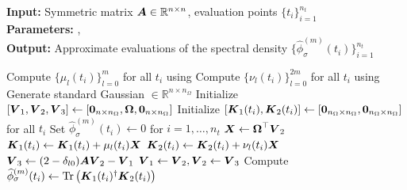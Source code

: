 \hspace*{\algorithmicindent} \textbf{Input:} Symmetric matrix $\boldsymbol{A} \in \mathbb{R}^{n \times n}$, evaluation points $\{t_i\}_{i=1}^{n_t}$ \\
\hspace*{\algorithmicindent} \textbf{Parameters:} ,  \\
\hspace*{\algorithmicindent} \textbf{Output:} Approximate evaluations of the spectral density $\{\widehat{\phi}_{\sigma}^{(m)}(t_i)\}_{i=1}^{n_t}$
\begin{algorithmic}[1]
    \State Compute $\{\mu_l(t_i)\}_{l=0}^{m}$ for all $t_i$ using 
    \State Compute $\{\nu_l(t_i)\}_{l=0}^{2m}$ for all $t_i$ using 
    \State Generate standard Gaussian  $\in \mathbb{R}^{n \times n_{\Omega}}$ %
    \State Initialize $[\boldsymbol{V}_1, \boldsymbol{V}_2, \boldsymbol{V}_3] \gets [\boldsymbol{0}_{n \times n_{\Omega}}, \boldsymbol{\Omega}, \boldsymbol{0}_{n \times n_{\Omega}}]$
    \State Initialize $[\boldsymbol{K}_1(t_i), \boldsymbol{K}_2(t_i)] \gets [\boldsymbol{0}_{n_{\Omega} \times n_{\Omega}}, \boldsymbol{0}_{n_{\Omega} \times n_{\Omega}}]$ for all $t_i$
    \State Set $\widehat{\phi}_{\sigma}^{(m)}(t_i) \gets 0$ for $i=1,\dots,n_t$
      \State $\boldsymbol{X} \gets \boldsymbol{\Omega}^{\top} \boldsymbol{V}_2$
            \State $\boldsymbol{K}_1(t_i) \gets \boldsymbol{K}_1(t_i) + \mu_l(t_i) \boldsymbol{X}$
        \EndIf
        \State $\boldsymbol{K}_2(t_i) \gets \boldsymbol{K}_2(t_i) + \nu_l(t_i) \boldsymbol{X}$
      \EndFor
      \State $\boldsymbol{V}_3 \gets (2 - \delta_{l0}) \boldsymbol{A} \boldsymbol{V}_2 - \boldsymbol{V}_1$ 
      \State $\boldsymbol{V}_1 \gets \boldsymbol{V}_2, \boldsymbol{V}_2 \gets \boldsymbol{V}_3$
    \EndFor
      \State Compute $\widehat{\phi}_{\sigma}^{(m)}(t_i) \gets \operatorname{Tr}\left( \boldsymbol{K}_1(t_i)^{\dagger}\boldsymbol{K}_2(t_i) \right)$ \label{lin:3-nystrom-pseudo-inverse}
    \EndFor
\end{algorithmic}
